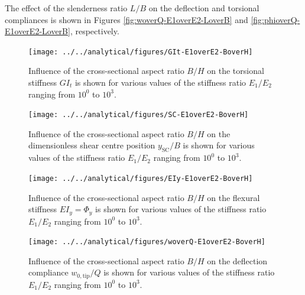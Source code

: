   The effect of the slenderness ratio $L/B$ on the deflection and torsional compliances is shown in Figures \ref{fig:woverQ-E1overE2-LoverB} and \ref{fig:phioverQ-E1overE2-LoverB}, respectively.

  \begin{figure}[!htpb] %
    \centering
    \texttt{[image: ../../analytical/figures/GIt-E1overE2-BoverH]}
    \caption[Influence of the cross-sectional aspect ratio $B/H$ on the torsional stiffness $GI_t$]{Influence of the cross-sectional aspect ratio $B/H$ on the torsional stiffness $GI_t$ is shown for various values of the stiffness ratio $E_1/E_2$ ranging from $10^0$ to $10^3$. }\label{fig:GIt-E1overE2-BoverH}
  \end{figure}

  \begin{figure}[!htpb] %
    \centering
    \texttt{[image: ../../analytical/figures/SC-E1overE2-BoverH]}
    \caption[Influence of the cross-sectional aspect ratio $B/H$ on the dimensionless shear centre position $y_{\mathrm{SC}}/B$]{Influence of the cross-sectional aspect ratio $B/H$ on the dimensionless shear centre position $y_{\mathrm{SC}}/B$ is shown for various values of the stiffness ratio $E_1/E_2$ ranging from $10^0$ to $10^3$. }\label{fig:SC-E1overE2-BoverH}
  \end{figure}

  \begin{figure}[!htpb] %
    \centering
    \texttt{[image: ../../analytical/figures/EIy-E1overE2-BoverH]}
    \caption[Influence of the cross-sectional aspect ratio $B/H$ on the flexural stiffness $EI_y$]{Influence of the cross-sectional aspect ratio $B/H$ on the flexural stiffness $EI_y = \Phi_y$ is shown for various values of the stiffness ratio $E_1/E_2$ ranging from $10^0$ to $10^3$. }\label{fig:EIy-E1overE2-BoverH}
  \end{figure}

  \begin{figure}[!htpb] %
    \centering
    \texttt{[image: ../../analytical/figures/woverQ-E1overE2-BoverH]}
    \caption[Influence of the cross-sectional aspect ratio $B/H$ on the deflection compliance]{Influence of the cross-sectional aspect ratio $B/H$ on the deflection compliance $w_{\mathrm{0,tip}} / Q$ is shown for various values of the stiffness ratio $E_1/E_2$ ranging from $10^0$ to $10^3$. }\label{fig:woverQ-E1overE2-BoverH}
  \end{figure}

